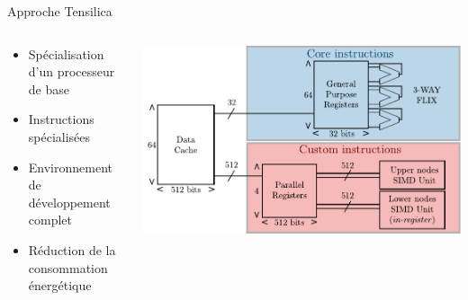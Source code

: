 \begin{frame}[c]{Approche Tensilica}
  \begin{columns}
    \begin{column}{.48\textwidth}
      \begin{itemize}
        \item Spécialisation d'un processeur de base
        \item Instructions spécialisées
        \item Environnement de développement complet
        \item<2-> Réduction de la consommation énergétique
      \end{itemize}
    \end{column}
    \begin{column}[T]{.48\textwidth}
    \only<+>
    {
      \vfill
      \includegraphics[width=\textwidth]{./fig/archi_tensilica}
      \vfill
    }
    \only<+->
    {
    \begin{table}[t]
      \centering
      {\small{}}
\end{table}}
\end{column}
\end{columns}
\end{frame}
